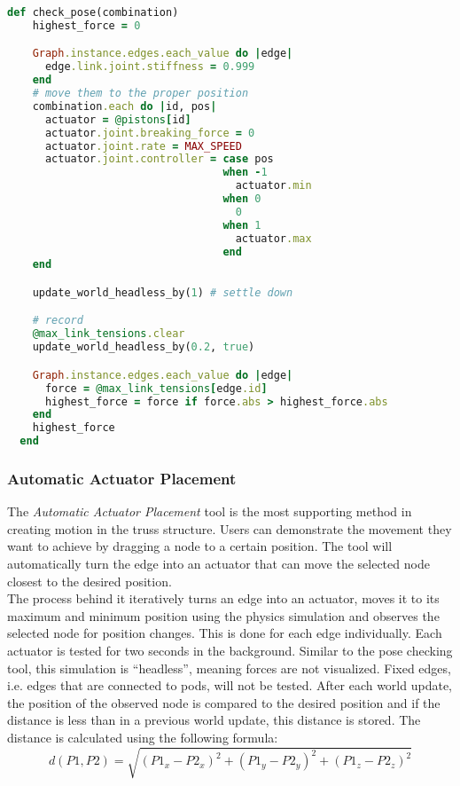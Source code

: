 \begin{lstlisting}[language=Ruby, label={lst:pose_check}, caption=The pose check algorithm.]
  def check_pose(combination)
    highest_force = 0

    Graph.instance.edges.each_value do |edge|
      edge.link.joint.stiffness = 0.999
    end
    # move them to the proper position
    combination.each do |id, pos|
      actuator = @pistons[id]
      actuator.joint.breaking_force = 0
      actuator.joint.rate = MAX_SPEED
      actuator.joint.controller = case pos
                                  when -1
                                    actuator.min
                                  when 0
                                    0
                                  when 1
                                    actuator.max
                                  end
    end

    update_world_headless_by(1) # settle down

    # record
    @max_link_tensions.clear
    update_world_headless_by(0.2, true)

    Graph.instance.edges.each_value do |edge|
      force = @max_link_tensions[edge.id]
      highest_force = force if force.abs > highest_force.abs
    end
    highest_force
  end
\end{lstlisting}

\subsubsection{Automatic Actuator Placement}
The \textit{Automatic Actuator Placement} tool is the most supporting method in creating motion in the truss structure. Users can demonstrate the movement they want to achieve by dragging a node to a certain position. The tool will automatically turn the edge into an actuator that can move the selected node closest to the desired position.\\
The process behind it iteratively turns an edge into an actuator, moves it to its maximum and minimum position using the physics simulation and observes the selected node for position changes. This is done for each edge individually. Each actuator is tested for two seconds in the background. Similar to the pose checking tool, this simulation is ``headless'', meaning forces are not visualized. Fixed edges, i.e. edges that are connected to pods, will not be tested. After each world update, the position of the observed node is compared to the desired position and if the distance is less than in a previous world update, this distance is stored. The distance is calculated using the following formula:
\begin{equation}
  d(P1, P2) = \sqrt{(P1_x - P2_x)^2 + (P1_y - P2_y)^2 + (P1_z - P2_z)^2}
\end{equation}

